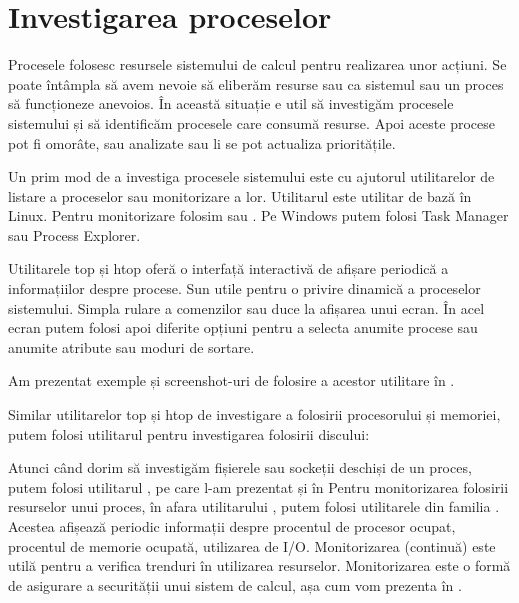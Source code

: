 \section{Investigarea proceselor}
\label{sec:procese-investigare}

Procesele folosesc resursele sistemului de calcul pentru realizarea unor
acțiuni. Se poate întâmpla să avem nevoie să eliberăm resurse sau ca sistemul
sau un proces să funcționeze anevoios. În această situație e util să investigăm
procesele sistemului și să identificăm procesele care consumă resurse. Apoi
aceste procese pot fi omorâte, sau analizate sau li se pot actualiza
prioritățile.

Un prim mod de a investiga procesele sistemului este cu ajutorul utilitarelor de
listare a proceselor sau monitorizare a lor. Utilitarul  este utilitar de bază
în Linux. Pentru monitorizare folosim  sau . Pe Windows putem folosi Task
Manager sau Process Explorer.

Utilitarele top și htop oferă o interfață interactivă de afișare periodică a
informațiilor despre procese. Sun utile pentru o privire dinamică a proceselor
sistemului. Simpla rulare a comenzilor  sau  duce la afișarea unui ecran.
În acel ecran putem folosi apoi diferite opțiuni pentru a selecta anumite
procese sau anumite atribute sau moduri de sortare.

Am prezentat exemple și screenshot-uri de folosire a acestor utilitare în .

Similar utilitarelor top și htop de investigare a folosirii procesorului și
memoriei, putem folosi utilitarul  pentru investigarea folosirii discului:


Atunci când dorim să investigăm fișierele sau sockeții deschiși de un proces,
putem folosi utilitarul , pe care l-am prezentat și în
 Pentru monitorizarea folosirii
resurselor unui proces, în afara utilitarului , putem folosi utilitarele din
familia . Acestea afișează periodic informații despre procentul de
procesor ocupat, procentul de memorie ocupată, utilizarea de I/O. Monitorizarea
(continuă) este utilă pentru a verifica trenduri în utilizarea resurselor.
Monitorizarea este o formă de asigurare a securității unui sistem de calcul, așa
cum vom prezenta în .

